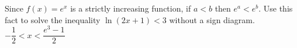 {\label{onetooneexpexercise} Since $f(x) = e^{x}$ is a strictly increasing function, if $a < b$ then $e^{a} < e^{b}$.  Use this fact to solve the inequality $\ln(2x + 1) < 3$ without a sign diagram.}
{ $-\dfrac{1}{2} < x < \dfrac{e^{3} - 1}{2}$}